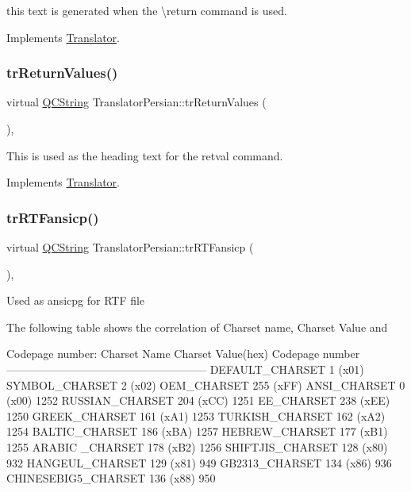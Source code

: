 this text is generated when the \textbackslash{}return command is used. 

Implements \mbox{\hyperlink{class_translator}{Translator}}.

\mbox{\label{class_translator_persian_ab606a7adc649c6915c84e55bc222cb77}} 
\subsubsection{\texorpdfstring{trReturnValues()}{trReturnValues()}}
{\footnotesize\ttfamily virtual \mbox{\hyperlink{class_q_c_string}{Q\+C\+String}} Translator\+Persian\+::tr\+Return\+Values (\begin{DoxyParamCaption}{ }\end{DoxyParamCaption})\hspace{0.3cm}{\ttfamily [inline]}, {\ttfamily [virtual]}}

This is used as the heading text for the retval command. 

Implements \mbox{\hyperlink{class_translator}{Translator}}.

\mbox{\label{class_translator_persian_a726bd8cac1d4e5623e5538b522c1bf31}} 
\subsubsection{\texorpdfstring{trRTFansicp()}{trRTFansicp()}}
{\footnotesize\ttfamily virtual \mbox{\hyperlink{class_q_c_string}{Q\+C\+String}} Translator\+Persian\+::tr\+R\+T\+Fansicp (\begin{DoxyParamCaption}{ }\end{DoxyParamCaption})\hspace{0.3cm}{\ttfamily [inline]}, {\ttfamily [virtual]}}

Used as ansicpg for R\+TF file

The following table shows the correlation of Charset name, Charset Value and 
\begin{DoxyPre}
Codepage number:
Charset Name       Charset Value(hex)  Codepage number
------------------------------------------------------
DEFAULT\_CHARSET           1 (x01)
SYMBOL\_CHARSET            2 (x02)
OEM\_CHARSET             255 (xFF)
ANSI\_CHARSET              0 (x00)            1252
RUSSIAN\_CHARSET         204 (xCC)            1251
EE\_CHARSET              238 (xEE)            1250
GREEK\_CHARSET           161 (xA1)            1253
TURKISH\_CHARSET         162 (xA2)            1254
BALTIC\_CHARSET          186 (xBA)            1257
HEBREW\_CHARSET          177 (xB1)            1255
ARABIC \_CHARSET         178 (xB2)            1256
SHIFTJIS\_CHARSET        128 (x80)             932
HANGEUL\_CHARSET         129 (x81)             949
GB2313\_CHARSET          134 (x86)             936
CHINESEBIG5\_CHARSET     136 (x88)             950
\end{DoxyPre}
 

